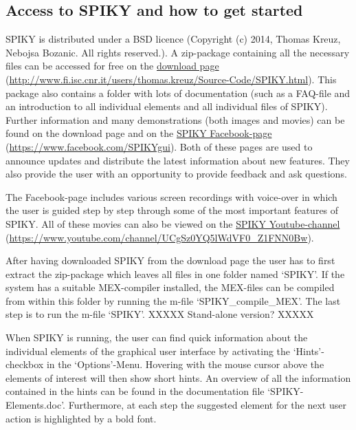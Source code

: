 \documentclass[10pt,twocolumn]{elsart5p}
\begin{document}
\subsection{\label{ss:Access} Access to SPIKY and how to get started}

SPIKY is distributed under a BSD licence (Copyright (c) 2014, Thomas Kreuz, Nebojsa Bozanic. All rights reserved.). A zip-package containing all the necessary files can be accessed for free on the \href{http://www.fi.isc.cnr.it/users/thomas.kreuz/Source-Code/SPIKY.html}{download page} (\url{http://www.fi.isc.cnr.it/users/thomas.kreuz/Source-Code/SPIKY.html}). This package also contains a folder with lots of documentation (such as a FAQ-file and an introduction to all individual elements and all individual files of SPIKY). Further information and many demonstrations (both images and movies) can be found on the download page and on the \href{https://www.facebook.com/SPIKYgui}{SPIKY Facebook-page} (\url{https://www.facebook.com/SPIKYgui}). Both of these pages are used to announce updates and distribute the latest information about new features. They also provide the user with an opportunity to provide feedback and ask questions.

The Facebook-page includes various screen recordings with voice-over in which the user is guided step by step through some of the most important features of SPIKY. All of these movies can also be viewed on the \href{https://www.youtube.com/channel/UCgSz0YQ5lWdVF0_Z1FNN0Bw}{SPIKY Youtube-channel} (\url{https://www.youtube.com/channel/UCgSz0YQ5lWdVF0_Z1FNN0Bw}).

After having downloaded SPIKY from the download page the user has to first extract the zip-package which leaves all files in one folder named `SPIKY'. If the system has a suitable MEX-compiler installed, the MEX-files can be compiled from within this folder by running the m-file `SPIKY\_compile\_MEX'. The last step is to run the m-file `SPIKY'. XXXXX Stand-alone version? XXXXX 

When SPIKY is running, the user can find quick information about the individual elements of the graphical user interface by activating the `Hints'-checkbox in the `Options'-Menu. Hovering with the mouse cursor above the elements of interest will then show short hints. An overview of all the information contained in the hints can be found in the documentation file `SPIKY-Elements.doc'. Furthermore, at each step the suggested element for the next user action is highlighted by a bold font. 
\end{document}
